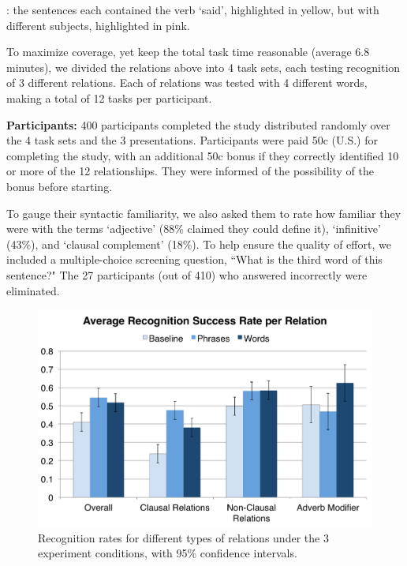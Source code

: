	\item {}: the sentences each contained the verb `said', highlighted in yellow, but with different subjects, highlighted in pink.
	\item {}
\squishend

To maximize coverage, yet keep the total task time reasonable (average 6.8 minutes), we divided the relations above into 4 task sets, each testing recognition of 3 different relations. Each of relations was tested with 4 different words, making a total of 12 tasks per participant.

{\bf Participants:} 400 participants completed the study distributed randomly over the 4 task sets and the 3 presentations. Participants were paid 50c (U.S.) for completing the study, with an additional 50c bonus if they correctly identified 10 or more of the 12 relationships. They were informed of the possibility of the bonus before starting.

 To gauge their syntactic familiarity, we also asked them to rate how familiar they were with the terms `adjective' (88\% claimed they could define it), `infinitive' (43\%), and `clausal complement' (18\%). To help ensure the quality of effort, we included a multiple-choice screening question, ``What is the third word of this sentence?"  The 27 participants (out of 410) who answered incorrectly were eliminated.



\begin{figure}
\centering
\includegraphics[width=\columnwidth]{fig/results}
\caption{\label{fig:results} Recognition rates for different types of relations under the 3 experiment conditions, with 95\% confidence intervals.}
\end{figure}

